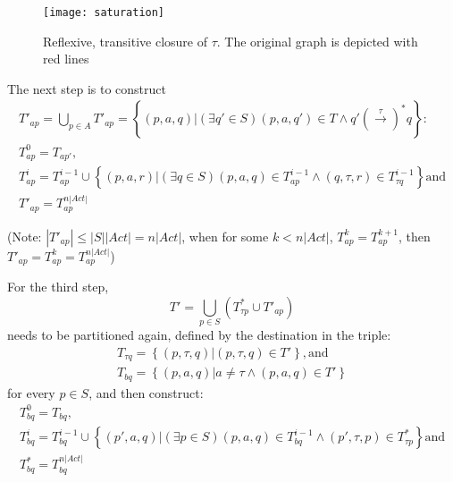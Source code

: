 \begin{figure}[!ht]
\centering
\texttt{[image: saturation]}
\caption{Reflexive, transitive closure of $\tau$. The original graph is depicted with red lines}
\label{fig:saturation}
\end{figure}

The next step is to construct 
\begin{equation}
	\begin{array}{lcl}
		T'_{ap}=\bigcup_{p\in A}T'_{ap}=\left\{\left(p,a,q\right)|\left(\exists q'\in S\right)\left(p,a,q'\right)\in T\wedge q'\left(\stackrel{\tau}{\rightarrow}\right)^{*}q\right\}:\\
		T^{0}_{ap}=T_{ap'},\\
		T^{i}_{ap}=T^{i-1}_{ap}\cup \left\{\left(p,a,r\right)|\left(\exists q\in S\right)\left(p,a,q\right)\in T^{i-1}_{ap}\wedge \left(q,\tau,r\right)\in T^{i-1}_{\tau q}\right\} \text{and} \\
		T'_{ap}=T^{n|Act|}_{ap}
	\end{array}
\end{equation}

(Note: $|T'_{ap}|\leq |S||Act|=n|Act|$, when for some $k<n|Act|$, $T^{k}_{ap}=T^{k+1}_{ap}$, then $T'_{ap}=T^{k}_{ap}=T^{n|Act|}_{ap}$)

For the third step, 
\begin{equation*}
	T'=\bigcup_{p\in S}\left(T^{*}_{\tau p}\cup T'_{ap}\right)
\end{equation*}
needs to be partitioned again, defined by the destination in the triple:
\begin{equation*}
	\begin{array}{lcl}
		T_{\tau q}=\left\{\left(p,\tau,q\right)|\left(p,\tau,q\right)\in T'\right\}, \text{and}\\
		T_{bq}=\left\{\left(p,a,q\right)|a\neq\tau\wedge\left(p,a,q\right)\in T'\right\}				    
	\end{array}
\end{equation*}
for every $p\in S$, and then construct:
\begin{equation*}
	\begin{array}{lcl}
		T^{0}_{bq}=T_{bq},\\
		T^{i}_{bq}=T^{i-1}_{bq}\cup\left\{\left(p',a,q\right)|\left(\exists p\in S\right)\left(p,a,q\right)\in T^{i-1}_{bq}\wedge\left(p',\tau,p\right)\in T^{*}_{\tau p}\right\} \text{and}\\
		T^{*}_{bq}=T^{n|Act|}_{bq}
	\end{array}
\end{equation*}

